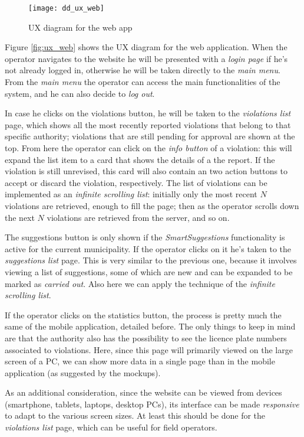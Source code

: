 \begin{figure}[ht]
    \centering
    \texttt{[image: dd\_ux\_web]}
    \caption{UX diagram for the web app}
    \label{fig:ux_web}
\end{figure}

Figure \vref{fig:ux_web} shows the UX diagram for the web application.
When the operator navigates to the website he will be presented with a
\emph{login page} if he's not already logged in, otherwise he will be
taken directly to the \emph{main menu}.
From the \emph{main menu} the operator can access the main functionalities
of the system, and he can also decide to \emph{log out}.

In case he clicks on the violations button, he will be taken to the
\emph{violations list} page, which shows all the most recently reported
violations that belong to that specific authority; violations that are still
pending for approval are shown at the top.
From here the operator can click on the \emph{info button} of a violation:
this will expand the list item to a card that shows the details of a the report.
If the violation is still unrevised, this card will also contain an two action
buttons to accept or discard the violation, respectively.
The list of violations can be implemented as an \emph{infinite scrolling list}:
initially only the most recent $N$ violations are retrieved, enough to fill
the page; then as the operator scrolls down the next $N$ violations are
retrieved from the server, and so on.

The suggestions button is only shown if the \emph{SmartSuggestions}
functionality is active for the current municipality. If the operator clicks on
it he's taken to the \emph{suggestions list} page.
This is very similar to the previous one, because it involves viewing a list
of suggestions, some of which are new and can be expanded to be marked as
\emph{carried out}. Also here we can apply the technique of the
\emph{infinite scrolling list}.

If the operator clicks on the statistics button, the process is pretty much the
same of the mobile application, detailed before.
The only things to keep in mind are that the authority also has the possibility
to see the licence plate numbers associated to violations.
Here, since this page will primarily viewed on the large screen of a PC,
we can show more data in a single page than in the mobile application
(as suggested by the mockups).

As an additional consideration, since the website can be viewed from devices
(smartphone, tablets, laptops, desktop PCs), its interface can be made
\emph{responsive} to adapt to the various screen sizes. At least this should be
done for the \emph{violations list} page, which can be useful for field
operators.